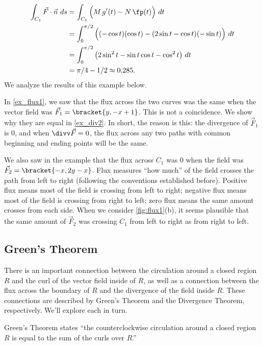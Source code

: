 {\begin{align*}
	\int_{C_1} \vec F\cdot \vec n\ ds
	& = \int_{C_1} \Big(M\,g'(t) - N\,\fp(t)\Big)\ dt\\
	&= \int_0^{\pi/2}\Big((-\cos t)(\cos t) - (2\sin t-\cos t)(-\sin t)\Big)\ dt\\
	&= \int_0^{\pi/2} \big(2\sin^2 t-\sin t\cos t-\cos^2t\big)\ dt\\
	&=\pi/4 - 1/2\approx 0.285.
\end{align*}
We analyze the results of this example below.}

In \autoref{ex_flux1}, we saw that the flux across the two curves was the same when the vector field was $\vec F_1 =\bracket{y, -x+1}$. This is not a coincidence. We show why they are equal in \autoref{ex_div2}. In short, the reason is this: the divergence of $\vec F_1$ is 0, and when $\divv \vec F = 0$, the flux across any two paths with common beginning and ending points will be the same.

We also saw in the example that the flux across $C_1$ was 0 when the field was $\vec F_2 =\bracket{-x, 2y-x}$. Flux measures ``how much'' of the field crosses the path from left to right (following the conventions established before). Positive flux means most of the field is crossing from left to right; negative flux means most of the field is crossing from right to left; zero flux means the same amount crosses from each side. When we consider \autoref{fig:flux1}(b), it seems plausible that the same amount of $\vec F_2$ was crossing $C_1$ from left to right as from right to left.

%
\subsection{Green's Theorem}

There is an important connection between the circulation around a closed region $R$ and the curl of the vector field inside of $R$, as well as a connection between the flux across the boundary of $R$ and the divergence of the field inside $R$. These connections are described by Green's Theorem and the Divergence Theorem, respectively. We'll explore each in turn.

Green's Theorem states ``the counterclockwise circulation around a closed region $R$ is equal to the sum of the curls over $R$.''

